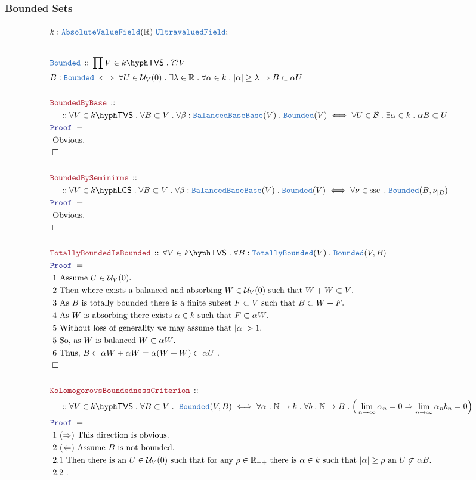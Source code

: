 \documentclass[12pt]{scrartcl}
\newcommand{\TYPE}[1]{\textcolor{NavyBlue}{\mathtt{#1}}}
\newcommand{\LOGIC}[1]{\textcolor{Blue}{\mathtt{#1}}}
\newcommand{\THM}[1]{\textcolor{Maroon}{\mathtt{#1}}}
\renewcommand{\.}{\; . \;}
\newcommand{\Theorem}[2]{& \THM{#1} \, :: \, #2 \\ & \Proof = \\ }
\newcommand{\DeclareType}[2]{& \TYPE{#1} \, :: \, #2 \\}
\newcommand{\DefineType}[3]{& #1 : \TYPE{#2} \iff #3 \\}
\newcommand{\NewLine}{\\ & \kern 1pc}
\newcommand{\Page}[1]{ \begin{align*} #1 \end{align*}   }
\newcommand{\Explain}[1]{& \text{#1.} \\}
\newcommand{\Imply}{\Rightarrow}
\newcommand{\Reals}{\mathbb{R} }
\newcommand{\Nat}{\mathbb{N} }
\newcommand{\QED}{\; \square}
\newcommand{\EndProof}{& \QED \\}
\newcommand{\Proof}{\LOGIC{Proof} \; }
\newcommand{\B}{\mathcal{B}}
\renewcommand{\U}{\mathcal{U}}
\newcommand{\Bounded}{\TYPE{Bounded}}
\newcommand{\TB}{\TYPE{TotallyBounded}}
\newcommand{\AVF}{\TYPE{AbsoluteValueField}}
\newcommand{\TVS}[1]{{#1}\hyph\mathsf{TVS}}
\newcommand{\LCS}[1]{{#1}\hyph\mathsf{LCS}}
\DeclareMathOperator{\ssc}{ssc}
\begin{document}
\subsubsection{Bounded Sets}
\Page{
	& k : \AVF(\Reals) \Big| \TYPE{UltravaluedField} ; \\
	\\
	\DeclareType{\Bounded}
	{
		\prod V \in \TVS{k} \.  ??V
	}
	\DefineType{B}{\Bounded}
	{
		\forall U \in \U_V(0) \. 
		\exists \lambda \in \Reals \.
		\forall \alpha \in k \.
		|\alpha| \ge \lambda 
		\Imply
		B \subset \alpha U
	}
	\\
	\Theorem{BoundedByBase}
	{
		\NewLine::		
		\forall V \in \TVS{k} \.
		\forall B \subset V \.
		\forall \beta : \TYPE{BalancedBase}\TYPE{Base}(V) \.
		\TYPE{Bounded}(V)  
		\iff
		\forall U \in \B \.
		\exists \alpha \in k \.
		\alpha B \subset U
	}
	\Explain{ Obvious}
	\EndProof
	\\
	\Theorem{BoundedBySeminirms}
	{
		\NewLine::		
		\forall V \in \LCS{k} \.
		\forall B \subset V \.
		\forall \beta : \TYPE{BalancedBase}\TYPE{Base}(V) \.
		\TYPE{Bounded}(V)  
		\iff
		\forall \nu \in \ssc \.
		\Bounded(B,\nu_{|B})
	}
	\Explain{ Obvious}
	\EndProof
	\\
	\Theorem{TotallyBoundedIsBounded}
	{
		\forall V \in \TVS{k} \. 
		\forall B : \TB(V) \.
		\Bounded(V,B) 
	}
	\Explain{ 1 Assume $U \in \U_V(0)$}
	\Explain{ 2 Then where exists a balanced  and absorbing $W \in \U_V(0)$ 
		such that  $W + W \subset V$}
	\Explain{ 
		3 As $B$ is
		totally bounded there is a finite subset $F \subset V$ 
		such that $B \subset W + F$}
	\Explain{
		4 As $W$ is absorbing there exists $\alpha\in k$ such that 
		$F \subset \alpha W$}
	\Explain{
		5 Without loss of generality we may assume that
		$|\alpha| > 1$}
	\Explain{
		5 So, as $W$ is balanced $W \subset \alpha W$}
	\Explain{
		6 Thus, $B \subset \alpha W + \alpha W = \alpha ( W + W) \subset \alpha U$	
	}
	\EndProof
	\\
	\Theorem{KolomogorovsBoundednessCriterion}
	{
		\NewLine ::		
		\forall V \in \TVS{k} \.
		\forall B \subset V \.\
		\Bounded(V,B)
		\iff
		\forall \alpha : \Nat \to k \. 
		\forall b : \Nat \to B \. \Big(
		\lim_{n \to \infty}  \alpha_n = 0
		\Imply
		\lim_{n \to \infty} \alpha_n b_n = 0 \Big)
	}
	\Explain{ 1 $(\Rightarrow)$ This direction is obvious}
	\Explain{ 2 $(\Leftarrow)$ Assume $B$ is not bounded}
	\Explain{ 2.1
		Then there is an $U \in \U_V(0)$ such that for any
		$\rho \in \Reals_{++}$ there is $\alpha \in k$ such
		that $|\alpha| \ge \rho$ an $U \not \subset \alpha B$}
	\Explain{  2.2 
}}
\end{document}
